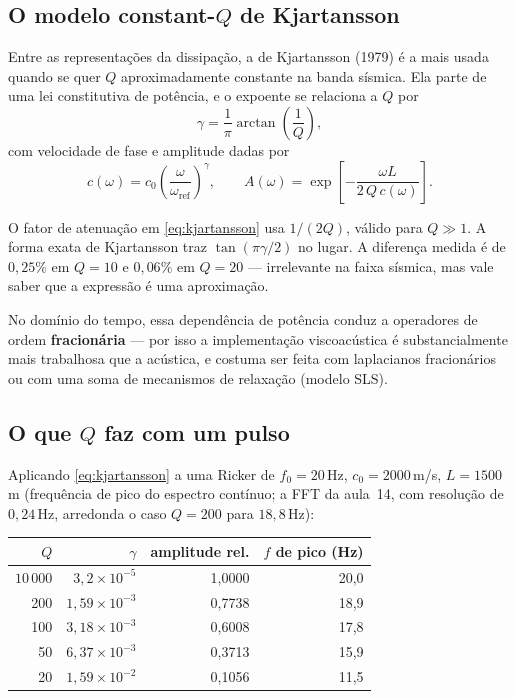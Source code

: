 \documentclass[11pt,a4paper,oneside]{report}
\begin{document}
\subsection*{O modelo constant-$Q$ de Kjartansson}

Entre as representa\c{c}\~oes da dissipa\c{c}\~ao, a de Kjartansson (1979) \'e
a mais usada quando se quer $Q$ aproximadamente constante na banda
s\'ismica. Ela parte de uma lei constitutiva de pot\^encia, e o expoente se
relaciona a $Q$ por
\begin{equation}
\gamma = \frac{1}{\pi}\arctan\!\left(\frac{1}{Q}\right),
\label{eq:gamma}
\end{equation}
com velocidade de fase e amplitude dadas por
\begin{equation}
c(\omega) = c_0\left(\frac{\omega}{\omega_{\text{ref}}}\right)^{\gamma},
\qquad
A(\omega) = \exp\!\left[-\frac{\omega L}{2\,Q\,c(\omega)}\right].
\label{eq:kjartansson}
\end{equation}

\begin{atencao}
O fator de atenua\c{c}\~ao em \eqref{eq:kjartansson} usa $1/(2Q)$, v\'alido
para $Q \gg 1$. A forma exata de Kjartansson traz $\tan(\pi\gamma/2)$ no
lugar. A diferen\c{c}a medida \'e de $0{,}25\%$ em $Q=10$ e $0{,}06\%$ em
$Q=20$ --- irrelevante na faixa s\'ismica, mas vale saber que a express\~ao
\'e uma aproxima\c{c}\~ao.
\end{atencao}

No dom\'inio do tempo, essa depend\^encia de pot\^encia conduz a operadores de
ordem \textbf{fracion\'aria} --- por isso a implementa\c{c}\~ao viscoac\'ustica
\'e substancialmente mais trabalhosa que a ac\'ustica, e costuma ser feita com
laplacianos fracion\'arios ou com uma soma de mecanismos de relaxa\c{c}\~ao
(modelo SLS).

\subsection*{O que $Q$ faz com um pulso}

Aplicando \eqref{eq:kjartansson} a uma Ricker de $f_0 = 20$\,Hz,
$c_0 = 2000$\,m/s, $L = 1500$\,m (frequ\^encia de pico do espectro
cont\'inuo; a FFT da aula~14, com resolu\c{c}\~ao de $0{,}24$\,Hz, arredonda o
caso $Q = 200$ para $18{,}8$\,Hz):

\begin{center}
\begin{tabular}{@{}rrrr@{}}
\toprule
$Q$ & $\gamma$ & \textbf{amplitude rel.} & $f$ de pico (Hz) \\
\midrule
$10\,000$ & $3{,}2\times10^{-5}$ & 1{,}0000 & 20{,}0 \\
200 & $1{,}59\times10^{-3}$ & 0{,}7738 & 18{,}9 \\
100 & $3{,}18\times10^{-3}$ & 0{,}6008 & 17{,}8 \\
50  & $6{,}37\times10^{-3}$ & 0{,}3713 & 15{,}9 \\
20  & $1{,}59\times10^{-2}$ & 0{,}1056 & 11{,}5 \\
\bottomrule
\end{tabular}
\end{center}
\end{document}
